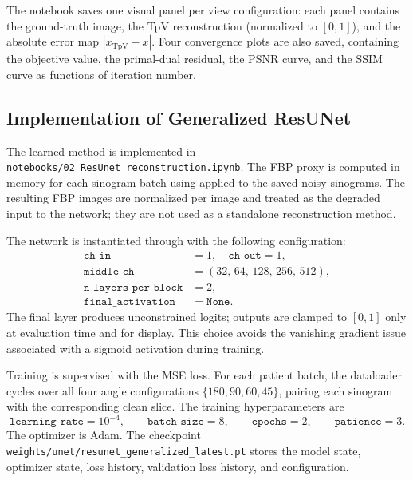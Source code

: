 \documentclass[11pt,a4paper]{article}
\begin{document}
The notebook saves one visual panel per view configuration: each panel contains
the ground-truth image, the TpV reconstruction (normalized to $[0,1]$), and the
absolute error map $|x_{\mathrm{TpV}} - x|$. Four convergence plots are also
saved, containing the objective value, the primal-dual residual, the PSNR
curve, and the SSIM curve as functions of iteration number.

\subsection{Implementation of Generalized ResUNet}

The learned method is implemented in
\texttt{notebooks/02\_ResUnet\_reconstruction.ipynb}. The FBP proxy is
computed in memory for each sinogram batch using
 applied to the saved noisy sinograms. The resulting
FBP images are normalized per image and treated as the degraded input to the
network; they are not used as a standalone reconstruction method.

The network is instantiated through  with the
following configuration:
\begin{equation}
  \begin{aligned}
  \texttt{ch\_in} &= 1,\quad \texttt{ch\_out} = 1,\\
  \texttt{middle\_ch} &= (32,\,64,\,128,\,256,\,512),\\
  \texttt{n\_layers\_per\_block} &= 2,\\
  \texttt{final\_activation} &= \texttt{None}.
  \end{aligned}
  \label{eq:resunet-config}
\end{equation}
The final layer produces unconstrained logits; outputs are clamped to $[0,1]$
only at evaluation time and for display. This choice avoids the vanishing
gradient issue associated with a sigmoid activation during training.

Training is supervised with the MSE loss. For each patient batch, the
dataloader cycles over all four angle configurations $\{180,90,60,45\}$,
pairing each sinogram with the corresponding clean slice. The training
hyperparameters are
\begin{equation}
  \texttt{learning\_rate}=10^{-4},
  \qquad
  \texttt{batch\_size}=8,
  \qquad
  \texttt{epochs}=2,
  \qquad
  \texttt{patience}=3.
  \label{eq:resunet-training-parameters}
\end{equation}
The optimizer is Adam. The checkpoint
\texttt{weights/unet/resunet\_generalized\_latest.pt} stores the model state,
optimizer state, loss history, validation loss history, and configuration.
\end{document}
